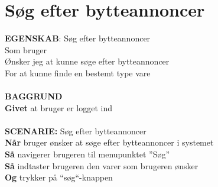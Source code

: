 \section{Søg efter bytteannoncer}
{\color{blue}\textbf{EGENSKAB}:} Søg efter bytteannoncer \\
Som bruger \\
Ønsker jeg at kunne søge efter bytteannoncer \\
For at kunne finde en bestemt type vare\\ \\
{\color{blue}\textbf{BAGGRUND}} \\
{\color{blue}\textbf{Givet}} at bruger er logget ind \\
\\
{\color{blue}\textbf{SCENARIE:}} Søg efter bytteannoncer \\
{\color{blue}\textbf{Når}} bruger ønsker at søge efter bytteannoncer i systemet\\
{\color{blue}\textbf{Så}} navigerer brugeren til menupunktet ”Søg” \\
{\color{blue}\textbf{Så}} indtaster brugeren den varer som brugeren ønsker\\
{\color{blue}\textbf{Og}} trykker på “søg“-knappen
